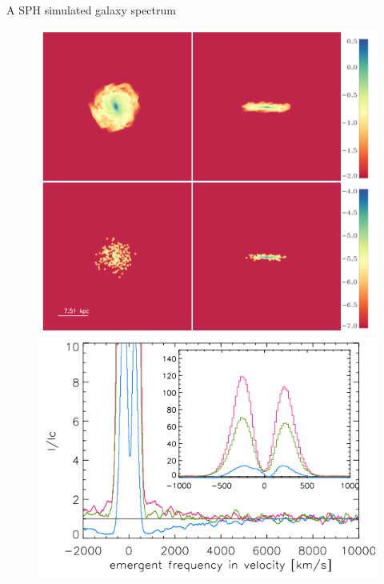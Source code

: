 \documentclass{beamer}
\begin{document}
\begin{frame}{A SPH simulated galaxy spectrum}
\begin{figure}
\includegraphics[scale=0.3]{Figures/verhamme1.png}
\includegraphics[scale=0.3]{Figures/Verhamme2.png}
\end{figure}
\end{frame}


\end{document}
